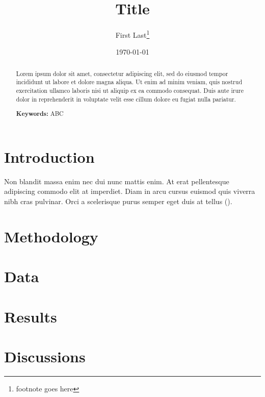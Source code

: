 \documentclass[11pt]{article}
\begin{document}
\begin{titlepage}
  \title{Title}
  \author{First Last\thanks{footnote goes here}}
  \date{\small \today}
  \maketitle
  
  \bigskip

  \begin{abstract}
    \noindent Lorem ipsum dolor sit amet, consectetur adipiscing elit, sed do eiusmod tempor incididunt ut labore et dolore magna aliqua. Ut enim ad minim veniam, quis nostrud exercitation ullamco laboris nisi ut aliquip ex ea commodo consequat. Duis aute irure dolor in reprehenderit in voluptate velit esse cillum dolore eu fugiat nulla pariatur. 

    \bigskip

    \noindent\textbf{Keywords:} ABC
  \end{abstract}

  \setcounter{page}{0}
  \thispagestyle{empty}
\end{titlepage}

\newpage

\section{Introduction} \label{sec:Introduction}

Non blandit massa enim nec dui nunc mattis enim. At erat pellentesque adipiscing commodo elit at imperdiet. Diam in arcu cursus euismod quis viverra nibh cras pulvinar. Orci a scelerisque purus semper eget duis at tellus (\cite{koenker2001quantile}). 

\section{Methodology} \label{sec:Methodology}

\section{Data} \label{sec:Data}

\section{Results} \label{sec:Results}

\section{Discussions} \label{sec:Discussion}
\end{document}
